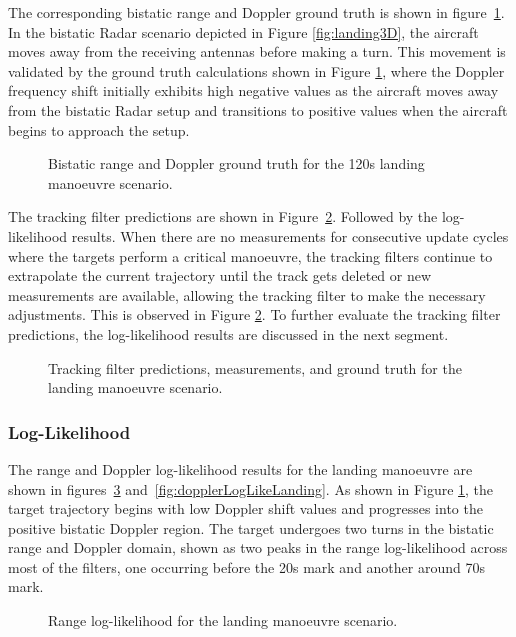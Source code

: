 The corresponding bistatic range and Doppler ground truth is shown in figure~\ref{fig:landingGT}. In the bistatic \ac{Radar} scenario depicted in Figure \ref{fig:landing3D}, the aircraft moves away from the receiving antennas before making a turn. This movement is validated by the ground truth calculations shown in Figure \ref{fig:landingGT}, where the Doppler frequency shift initially exhibits high negative values as the aircraft moves away from the bistatic \ac{Radar} setup and transitions to positive values when the aircraft begins to approach the setup.
\newline 
\begin{figure}[H]
    \centering
    
    \caption{Bistatic range and Doppler ground truth for the 120s landing manoeuvre scenario.}
    \label{fig:landingGT}
\end{figure}

The tracking filter predictions are shown in Figure~\ref{fig:LandingFilterOutputs}. Followed by the log-likelihood results. When there are no measurements for consecutive update cycles where the targets perform a critical manoeuvre, the tracking filters continue to extrapolate the current trajectory until the track gets deleted or new measurements are available, allowing the tracking filter to make the necessary adjustments. This is observed in Figure \ref{fig:LandingFilterOutputs}. To further evaluate the tracking filter predictions, the log-likelihood results are discussed in the next segment.
\newline
\begin{figure}[H]
    \centering
    
    \caption{Tracking filter predictions, measurements, and ground truth for the landing manoeuvre scenario.}
    \label{fig:LandingFilterOutputs}
\end{figure}


\subsubsection{Log-Likelihood}
The range and Doppler log-likelihood results for the landing manoeuvre are shown in figures~\ref{fig:rangeLogLikeLanding} and~\ref{fig:dopplerLogLikeLanding}. As shown in Figure \ref{fig:landingGT}, the target trajectory begins with low Doppler shift values and progresses into the positive bistatic Doppler region. The target undergoes two turns in the bistatic range and Doppler domain, shown as two peaks in the range log-likelihood across most of the filters, one occurring before the 20s mark and another around  70s mark.
\newline
\begin{figure}[H]
    \centering
    
    \caption{Range log-likelihood for the landing manoeuvre scenario.}
    \label{fig:rangeLogLikeLanding}
\end{figure}


